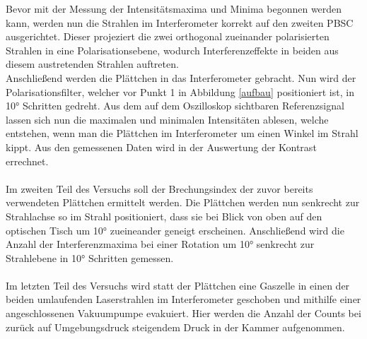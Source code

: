   Bevor mit der Messung der Intensitätsmaxima und Minima begonnen werden kann, werden nun die Strahlen im Interferometer korrekt auf den zweiten PBSC ausgerichtet. Dieser projeziert die zwei orthogonal zueinander polarisierten Strahlen in eine Polarisationsebene, wodurch Interferenzeffekte in beiden aus diesem austretenden Strahlen auftreten.\\
  Anschließend werden die Plättchen in das Interferometer gebracht. Nun wird der Polarisationsfilter, welcher vor Punkt 1 in Abbildung \ref{aufbau} positioniert ist,
  in 10° Schritten gedreht.
	Aus dem auf dem Oszilloskop sichtbaren Referenzsignal lassen sich nun die maximalen und minimalen Intensitäten ablesen, welche entstehen, wenn
  man die Plättchen im Interferometer um einen Winkel im Strahl kippt. Aus den gemessenen Daten wird in der Auswertung der Kontrast errechnet.\\
  \\
  Im zweiten Teil des Versuchs soll der Brechungsindex der zuvor bereits verwendeten Plättchen ermittelt werden. Die Plättchen werden nun senkrecht zur Strahlachse so im Strahl positioniert, dass sie bei Blick von oben auf den optischen Tisch um 10° zueineander geneigt erscheinen.
  Anschließend wird die Anzahl der Interferenzmaxima bei einer Rotation um 10° senkrecht zur Strahlebene in 10° Schritten gemessen.\\
  \\
  Im letzten Teil des Versuchs wird statt der Plättchen eine Gaszelle in einen der beiden umlaufenden Laserstrahlen im Interferometer geschoben und mithilfe einer angeschlossenen Vakuumpumpe evakuiert.
  Hier werden die Anzahl der Counts bei zurück auf Umgebungsdruck steigendem Druck in der Kammer aufgenommen.
